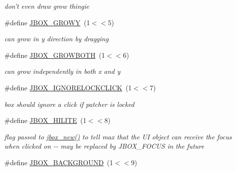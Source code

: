\begin{DoxyCompactItemize}
\begin{DoxyCompactList}\small\item\em don't even draw grow thingie \item\end{DoxyCompactList}\item 
\hypertarget{group__jbox_gaf151bcea416076c6811b84bd5cbaf68f}{
\#define \hyperlink{group__jbox_gaf151bcea416076c6811b84bd5cbaf68f}{JBOX\_\-GROWY}~(1$<$$<$5)}
\label{group__jbox_gaf151bcea416076c6811b84bd5cbaf68f}

\begin{DoxyCompactList}\small\item\em can grow in y direction by dragging \item\end{DoxyCompactList}\item 
\hypertarget{group__jbox_gaf7d65744237d64595b1a7e9884b03a05}{
\#define \hyperlink{group__jbox_gaf7d65744237d64595b1a7e9884b03a05}{JBOX\_\-GROWBOTH}~(1$<$$<$6)}
\label{group__jbox_gaf7d65744237d64595b1a7e9884b03a05}

\begin{DoxyCompactList}\small\item\em can grow independently in both x and y \item\end{DoxyCompactList}\item 
\hypertarget{group__jbox_ga07e3f6ad55a385a4bb268f8f7b78ab3e}{
\#define \hyperlink{group__jbox_ga07e3f6ad55a385a4bb268f8f7b78ab3e}{JBOX\_\-IGNORELOCKCLICK}~(1$<$$<$7)}
\label{group__jbox_ga07e3f6ad55a385a4bb268f8f7b78ab3e}

\begin{DoxyCompactList}\small\item\em box should ignore a click if patcher is locked \item\end{DoxyCompactList}\item 
\hypertarget{group__jbox_gae172d0c858232c903a5dd9d847f1a951}{
\#define \hyperlink{group__jbox_gae172d0c858232c903a5dd9d847f1a951}{JBOX\_\-HILITE}~(1$<$$<$8)}
\label{group__jbox_gae172d0c858232c903a5dd9d847f1a951}

\begin{DoxyCompactList}\small\item\em flag passed to \hyperlink{group__jbox_gaaa460d02ca3d22c54368ade59d8e330b}{jbox\_\-new()} to tell max that the UI object can receive the focus when clicked on -\/-\/ may be replaced by JBOX\_\-FOCUS in the future \item\end{DoxyCompactList}\item 
\hypertarget{group__jbox_ga17ab73ccfb0a841d104e3f11983a0c2f}{
\#define \hyperlink{group__jbox_ga17ab73ccfb0a841d104e3f11983a0c2f}{JBOX\_\-BACKGROUND}~(1$<$$<$9)}
\label{group__jbox_ga17ab73ccfb0a841d104e3f11983a0c2f}


\end{DoxyCompactItemize}
